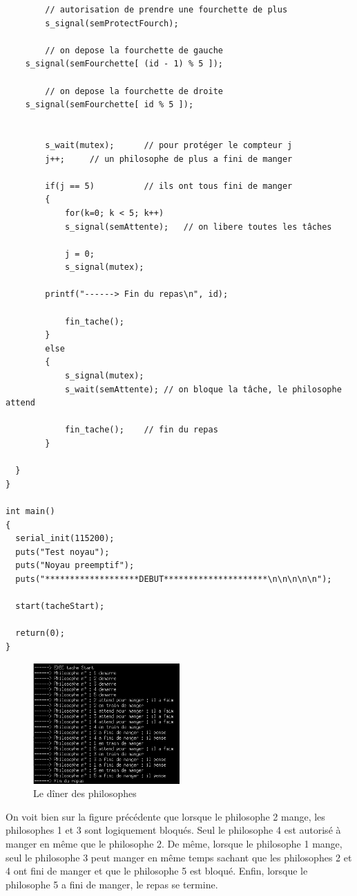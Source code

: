 \documentclass[a4paper,12pt]{report}
\begin{document}
\begin{lstlisting}
		// autorisation de prendre une fourchette de plus
		s_signal(semProtectFourch);
		
		// on depose la fourchette de gauche
    s_signal(semFourchette[ (id - 1) % 5 ]); 
		
		// on depose la fourchette de droite
    s_signal(semFourchette[ id % 5 ]);	


		s_wait(mutex);		// pour protéger le compteur j
		j++;	 // un philosophe de plus a fini de manger

		if(j == 5) 			// ils ont tous fini de manger
		{
			for(k=0; k < 5; k++)
			s_signal(semAttente);	// on libere toutes les tâches 

			j = 0;						
			s_signal(mutex);

	    printf("------> Fin du repas\n", id);

			fin_tache();		
		}
		else
		{
			s_signal(mutex);
			s_wait(semAttente);	// on bloque la tâche, le philosophe attend 

			fin_tache();	// fin du repas
		}

  }
}

int main()
{
  serial_init(115200);
  puts("Test noyau");
  puts("Noyau preemptif");
  puts("*******************DEBUT*********************\n\n\n\n\n");

  start(tacheStart);

  return(0);
}
\end{lstlisting}


\begin{figure}[h]
	\centering
		\includegraphics[width=0.5\textwidth]{screens/philo_pense_meme_vitesse.png}
		\caption{Le dîner des philosophes}
\end{figure}

\newpage

On voit bien sur la figure précédente que lorsque le philosophe 2 mange, les philosophes 1 et 3 sont logiquement bloqués. Seul le philosophe 4 est autorisé à manger en même que le philosophe 2. De même, lorsque le philosophe 1 mange, seul le philosophe 3 peut manger en même temps sachant que les philosophes 2 et 4 ont fini de manger et que le philosophe 5 est bloqué. Enfin, lorsque le philosophe 5 a fini de manger, le repas se termine.
\end{document}
